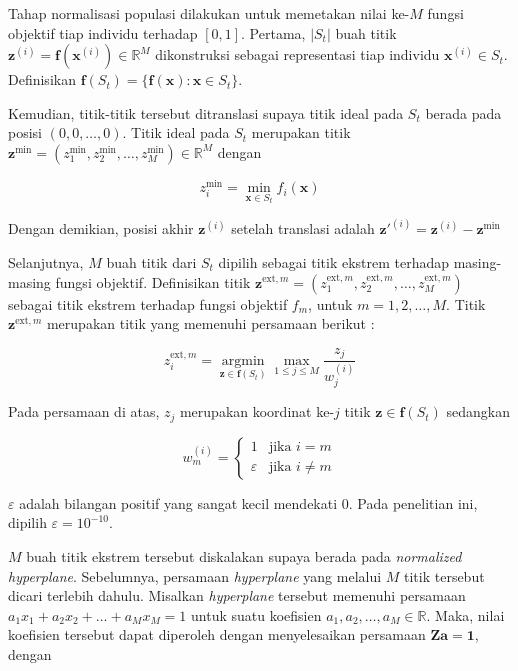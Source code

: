 Tahap normalisasi populasi dilakukan untuk memetakan nilai ke-$M$ fungsi objektif tiap individu terhadap $[0,1]$. Pertama, $|S_t|$ buah titik $\mathbf{z}^{(i)} = \mathbf{f}(\mathbf{x}^{(i)})\in \mathbb{R}^M$ dikonstruksi sebagai representasi tiap individu $\mathbf{x}^{(i)} \in S_t$. Definisikan $\mathbf{f}(S_t)=\{\mathbf{f}(\mathbf{x}) : \mathbf{x} \in S_t\}$.

Kemudian, titik-titik tersebut ditranslasi supaya titik ideal pada $S_t$ berada pada posisi $(0,0,\dots,0)$. Titik ideal pada $S_t$ merupakan titik $\mathbf{z}^{\min} = (z_1^{\min}, z_2^{\min}, \dots, z_M^{\min}) \in \mathbb{R}^M$ dengan 

\begin{equation}
  z_i^{\min} = \min_{\mathbf{x}\in S_t}f_i(\mathbf{x})
\end{equation}

Dengan demikian, posisi akhir $\mathbf{z}^{(i)}$ setelah translasi adalah $\mathbf{z'}^{(i)} = \mathbf{z}^{(i)} - \mathbf{z}^{\min}$

Selanjutnya, $M$ buah titik dari $S_t$ dipilih sebagai titik ekstrem terhadap masing-masing fungsi objektif. Definisikan titik $\mathbf{z}^{\text{ext},m} = (z^{\text{ext},m}_1,z^{\text{ext},m}_2,\dots,z^{\text{ext},m}_M)$ sebagai titik ekstrem terhadap fungsi objektif $f_m$, untuk $m=1,2,\dots,M$. Titik $\mathbf{z}^{\text{ext},m}$ merupakan titik yang memenuhi persamaan berikut :  

\begin{equation}
  z_i^{\text{ext},m}=
  \underset{\mathbf{z} \in \mathbf{f}(S_t)}{\operatorname{argmin}}\max_{1\leq j \leq M}\frac{z_j}{w^{(i)}_j}
\end{equation}

Pada persamaan di atas, $z_j$ merupakan koordinat ke-$j$ titik $\mathbf{z} \in \mathbf{f}(S_t)$ sedangkan 

\begin{equation}
  w_m^{(i)}=
  \begin{cases}
    1 & \text{jika $i=m$} \\
    \varepsilon & \text{jika $i \neq m$} 
  \end{cases}
\end{equation}

$\varepsilon$ adalah bilangan positif yang sangat kecil mendekati $0$. Pada penelitian ini, dipilih $\varepsilon = 10^{-10}$. 

$M$ buah titik ekstrem tersebut diskalakan supaya berada pada \textit{normalized hyperplane}. Sebelumnya, persamaan \textit{hyperplane} yang melalui $M$ titik tersebut dicari terlebih dahulu. 
Misalkan \textit{hyperplane} tersebut memenuhi persamaan $a_1x_1+a_2x_2+\dots+a_Mx_M=1$ untuk suatu koefisien $a_1,a_2,\dots,a_M\in\mathbb{R}$. Maka, nilai koefisien tersebut dapat diperoleh dengan menyelesaikan persamaan $\mathbf{Za=1}$, dengan

